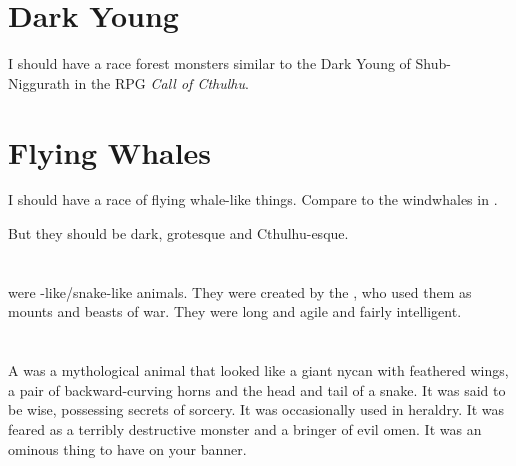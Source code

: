 \section{Dark Young}
I should have a race forest monsters similar to the Dark Young of Shub-Niggurath in the RPG \emph{Call of Cthulhu}. 














\section{Flying Whales}
I should have a race of flying whale-like things. 
Compare to the windwhales in \cite{GlenCook:TheWhiteRose}. 

But they should be dark, grotesque and Cthulhu-esque. 














\section{\Lindworm}
\index{\lindworm}
\Lindworms were \dragon-like/snake-like animals. 
They were created by the \ophidians, who used them as mounts and beasts of war. 
They were long and agile and fairly intelligent. 














\section{\Malgryph}
\index{\malgryph}
A \malgryph was a mythological animal that looked like a giant nycan with feathered wings, a pair of backward-curving horns and the head and tail of a snake.
It was said to be wise, possessing secrets of sorcery.
It was occasionally used in heraldry. 
It was feared as a terribly destructive monster and a bringer of evil omen.
It was an ominous thing to have on your banner.

